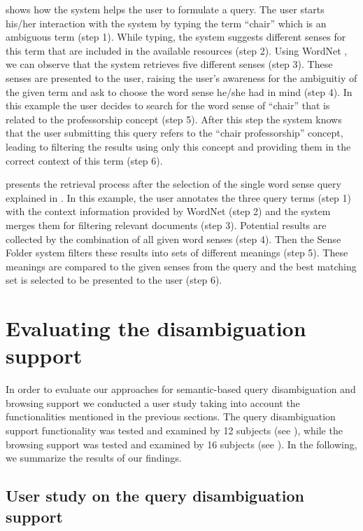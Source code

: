 \documentclass[output=paper]{LSP/langsci}
\begin{document}
 shows how the system helps the user to formulate a query. The user starts his/her interaction with the system by typing the term ``chair'' which is an ambiguous term (step 1). While typing, the system suggests different senses for this term that are included in the available resources (step 2). Using WordNet \citet{Fel98}, we can observe that the system retrieves five different senses (step 3). These senses are presented to the user, raising the user's awareness for the ambiguitiy of the given term and ask to choose the word sense he/she had in mind (step 4). In this example the user decides to search for the word sense of ``chair'' that is related to the professorship concept (step 5). After this step the system knows that the user submitting this query refers to the ``chair professorship'' concept, leading to filtering the results using only this concept and providing them in the correct context of this term (step 6). 

 presents the retrieval process after the selection of the single word sense query explained in . In this example, the user annotates the three query terms (step 1) with the context information provided by WordNet (step 2) and the system merges them for filtering relevant documents (step 3). Potential results are collected by the combination of all given word senses (step 4). Then the Sense Folder system filters these results into sets of different meanings (step 5). These meanings are compared to the given senses from the query and the best matching set is selected to be presented to the user (step 6).

\section{Evaluating the disambiguation support}\label{sec:user_study}
In order to evaluate our approaches for semantic-based query disambiguation and browsing support we conducted a user study taking into account the functionalities mentioned in the previous sections. 
The query disambiguation support functionality was tested and examined by 12 subjects (see ), while the browsing support was tested and examined by 16 subjects (see ). In the following, we summarize the results of our findings.

\subsection{User study on the query disambiguation support}\label{qoss}
\end{document}
